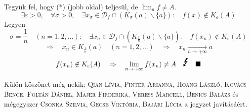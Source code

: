 \documentclass[a4paper,11.5pt]{article}
\begin{document}
\begin{enumerate}
		Tegyük fel, hogy (*) (jobb oldal) teljesül, de $\displaystyle\lim_af\not=A$.
		\[ \exists \varepsilon>0,\quad \forall \sigma>0,\quad \exists x_\sigma \in \mathcal{D}_f\cap(K_\sigma(a)\backslash\{a\}):\quad f(x)\not\in K_\varepsilon(A) \]
		Legyen
		\[\sigma=\frac{1}{n}\quad (n=1,2,\ldots):\quad \exists x_n\in\mathcal{D}_f\cap(K_{\frac{1}{n}}(a)\backslash\{a\}):\quad f(x_n)\not\in K_\varepsilon(A)\]
		\[\Rightarrow\quad x_n\in K_{\frac{1}{n}}(a)\quad (n=1,2,\ldots)\quad \Rightarrow\quad x_n\underset{n\to+\infty}{\longrightarrow} a\]
		\[f(x_n)\not\in K_\varepsilon(A)\quad \Rightarrow\quad \lim_{n\to+\infty}f(x_n)\not=A  \quad \text{{\LARGE\Lightning}}\quad \blacksquare\]
		
	\end{enumerate}
	
	Külön köszönet még nekik: \textsc{Qian Lívia}, \textsc{Pintér Arianna}, \textsc{Hoang László}, \textsc{Kovács Bence}, \textsc{Foltán Dániel}, \textsc{Majer Firderika}, \textsc{Veress Marcell}, \textsc{Benics Balázs} és mégegyszer \textsc{Csonka Szilvia}, \textsc{Gecse Viktória}, \textsc{Bajári Lúcia} a jegyzet javításáért.
\end{document}
